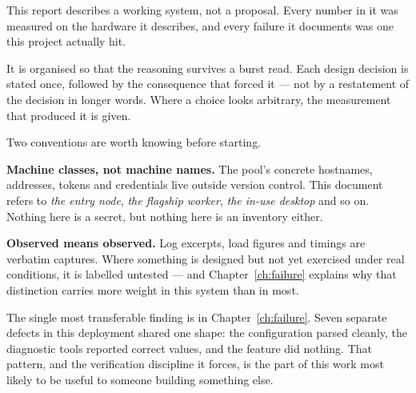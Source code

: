 This report describes a working system, not a proposal. Every number in it was
measured on the hardware it describes, and every failure it documents was one
this project actually hit.

It is organised so that the reasoning survives a burst read. Each design
decision is stated once, followed by the consequence that forced it --- not by a
restatement of the decision in longer words. Where a choice looks arbitrary, the
measurement that produced it is given.

Two conventions are worth knowing before starting.

\textbf{Machine classes, not machine names.} The pool's concrete hostnames,
addresses, tokens and credentials live outside version control. This document
refers to \emph{the entry node}, \emph{the flagship worker}, \emph{the in-use
desktop} and so on. Nothing here is a secret, but nothing here is an inventory
either.

\textbf{Observed means observed.} Log excerpts, load figures and timings are
verbatim captures. Where something is designed but not yet exercised under real
conditions, it is labelled untested --- and Chapter~\ref{ch:failure} explains
why that distinction carries more weight in this system than in most.

The single most transferable finding is in Chapter~\ref{ch:failure}. Seven
separate defects in this deployment shared one shape: the configuration parsed
cleanly, the diagnostic tools reported correct values, and the feature did
nothing. That pattern, and the verification discipline it forces, is the part of
this work most likely to be useful to someone building something else.
